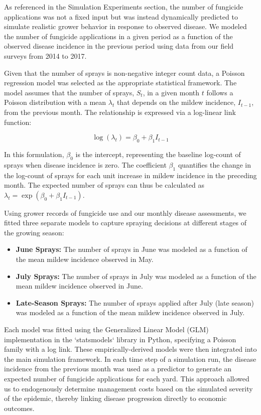 \documentclass[10pt,a4paper]{article}
\begin{document}
As referenced in the Simulation Experiments section, the number of fungicide applications was not a fixed input but was instead dynamically predicted to simulate realistic grower behavior in response to observed disease. We modeled the number of fungicide applications in a given period as a function of the observed disease incidence in the previous period using data from our field surveys from 2014 to 2017.

Given that the number of sprays is non-negative integer count data, a Poisson regression model was selected as the appropriate statistical framework. The model assumes that the number of sprays, $S_t$, in a given month $t$ follows a Poisson distribution with a mean $\lambda_t$ that depends on the mildew incidence, $I_{t-1}$, from the previous month. The relationship is expressed via a log-linear link function:

$$ \log(\lambda_t) = \beta_0 + \beta_1 I_{t-1} $$

In this formulation, $\beta_0$ is the intercept, representing the baseline log-count of sprays when disease incidence is zero. The coefficient $\beta_1$ quantifies the change in the log-count of sprays for each unit increase in mildew incidence in the preceding month. The expected number of sprays can thus be calculated as $\lambda_t = \exp(\beta_0 + \beta_1 I_{t-1})$.

Using grower records of fungicide use and our monthly disease assessments, we fitted three separate models to capture spraying decisions at different stages of the growing season:
\begin{itemize}
    \item \textbf{June Sprays:} The number of sprays in June was modeled as a function of the mean mildew incidence observed in May.
    \item \textbf{July Sprays:} The number of sprays in July was modeled as a function of the mean mildew incidence observed in June.
    \item \textbf{Late-Season Sprays:} The number of sprays applied after July (late season) was modeled as a function of the mean mildew incidence observed in July.
\end{itemize}

Each model was fitted using the Generalized Linear Model (GLM) implementation in the `statsmodels` library in Python, specifying a Poisson family with a log link. These empirically-derived models were then integrated into the main simulation framework. In each time step of a simulation run, the disease incidence from the previous month was used as a predictor to generate an expected number of fungicide applications for each yard. This approach allowed us to endogenously determine management costs based on the simulated severity of the epidemic, thereby linking disease progression directly to economic outcomes.
\end{document}
